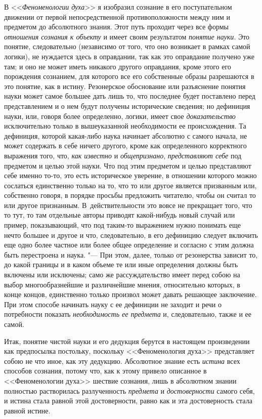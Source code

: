 В <<{\em Феноменологии духа}>> я изобразил сознание в его
поступательном движении от первой непосредственной противоположности между
ним и предметом до абсолютного знания. Этот путь проходит через все формы
{\em отношения сознания к объекту} и имеет своим
результатом {\em понятие науки}. Это понятие,
следовательно (независимо от того, что оно возникает в рамках самой
логики), не нуждается здесь в оправдании, так как это оправдание получено
уже там; и оно не может иметь никакого другого оправдания, кроме этого его
порождения сознанием, для которого все его собственные образы разрешаются в
это понятие, как в истину. Резонерское обоснование или разъяснение
понятия науки может самое большее дать лишь то, что последнее будет
поставлено перед представлением и о нем будут получены исторические
сведения; но дефиниция науки, или, говоря более определенно, логики, имеет
свое {\em доказательство} исключительно только в
вышеуказанной необходимости ее происхождения. Та дефиниция, которой
какая-либо наука начинает абсолютно с самого начала, не может содержать в
себе ничего другого, кроме как определенного корректного выражения того,
что, {\em как известно} и {\em общепризнано},
{\em представляют себе} под предметом и целью этой
науки. Что под этим предметом и целью представляют себе именно то-то, это
есть историческое уверение, в отношении которого можно сослаться
единственно только на то, что то или другое является призванным или,
собственно говоря, в порядке просьбы предложить читателю, чтобы он считал
то или другое признанным. В~действительности это вовсе не прекращает того,
что то тут, то там отдельные авторы приводят какой-нибудь новый случай или
пример, показывающий, что под таким-то выражением нужно понимать еще нечто
большее и другое и что, следовательно, в его дефиницию следует включить еще
одно более частное или более общее определение и согласно с этим должна
быть перестроена и наука. "--- При этом, далее, только от резонерства
зависит то, до какой границы и в каком объеме те или иные определения
должны быть включены или исключены; само же рассуждательство имеет перед
собою на выбор многообразнейшие и различнейшие мнения, относительно
которых, в конце концов, единственно только произвол может давать решающее
заключение. При этом способе начинать науку с ее дефиниции не заходит и
речи о потребности показать {\em необходимость ее
предмета} и, следовательно, также и ее самой.

Итак, понятие чистой науки и его дедукция берутся в настоящем произведении
как предпосылка постольку, поскольку <<Феноменология духа>> представляет
собою не что иное, как эту дедукцию. Абсолютное знание есть
{\em истина} всех способов сознания, потому что, как к
этому привело описанное в <<Феноменологии духа>> шествие сознания, лишь в
абсолютном знании полностью растворилась разлученность
{\em предмета} и {\em достоверности} самого себя, и истина стала равной
этой достоверности, равно как и эта достоверность стала равной истине.

